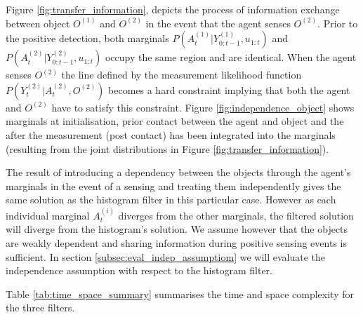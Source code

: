 Figure \ref{fig:transfer_information}, depicts the process of information exchange between object $O^{(1)}$ and $O^{(2)}$ in the event that the agent 
senses $O^{(2)}$. Prior to the positive detection, both marginals $P(A^{(1)}_t|Y^{(1)}_{0:t-1},u_{1:t})$ and $P(A^{(2)}_t|Y^{(2)}_{0:t-1},u_{1:t})$ 
occupy the same region and are identical. When the agent senses $O^{(2)}$ the line defined by the measurement 
likelihood function $P(Y^{(2)}_t|A^{(2)}_t,O^{(2)})$ becomes a hard constraint implying that both the agent and $O^{(2)}$ have to satisfy this constraint.
Figure \ref{fig:independence_object} shows marginals at initialisation, prior contact between the agent and object and the after the measurement 
(post contact) has been integrated into the marginals (resulting from the joint distributions in Figure \ref{fig:transfer_information}).

The result of introducing a dependency between the objects through the agent's marginals in the event of a sensing and treating them
independently gives the same solution as the histogram filter in this particular case. However as each individual marginal $A^{(i)}_t$ diverges 
from the other marginals, the filtered solution will diverge from the histogram's solution. We assume however that the objects are weakly 
dependent and sharing information during positive sensing events is sufficient. In section \ref{subsec:eval_indep_assumptiom} we will 
evaluate the independence assumption with respect to the histogram filter.

Table \ref{tab:time_space_summary} summarises the time and space complexity for the three filters.%

